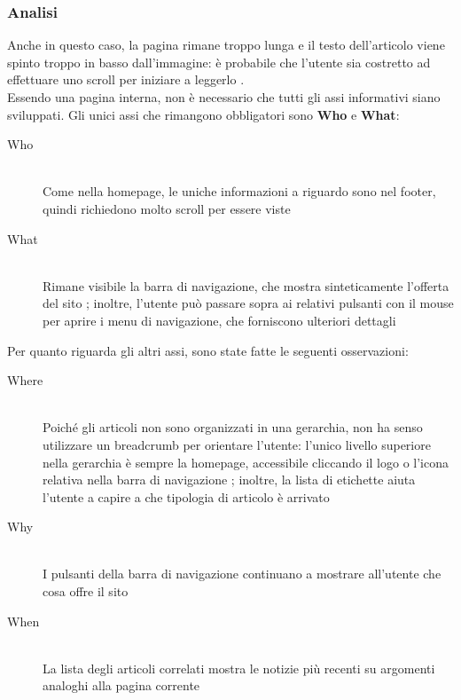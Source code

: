 \subsubsection{Analisi}
\label{sub:articolo-analisi}
Anche in questo caso, la pagina rimane troppo lunga \xmark e il testo dell'articolo viene spinto troppo in basso dall'immagine: è probabile che l'utente sia costretto ad effettuare uno scroll per iniziare a leggerlo \xmark.\\
Essendo una pagina interna, non è necessario che tutti gli assi informativi siano sviluppati. Gli unici assi che rimangono obbligatori sono \textbf{Who} e \textbf{What}:
\begin{description}
    \item[Who] \hfill \\ Come nella homepage, le uniche informazioni a riguardo sono nel footer, quindi richiedono molto scroll per essere viste \xmark
    \item[What] \hfill \\ Rimane visibile la barra di navigazione, che mostra sinteticamente l'offerta del sito \cmark; inoltre, l'utente può passare sopra ai relativi pulsanti con il mouse per aprire i menu di navigazione, che forniscono ulteriori dettagli \cmark
\end{description}
Per quanto riguarda gli altri assi, sono state fatte le seguenti osservazioni:
\begin{description}
    \item[Where] \hfill \\ Poiché gli articoli non sono organizzati in una gerarchia, non ha senso utilizzare un breadcrumb per orientare l'utente: l'unico livello superiore nella gerarchia è sempre la homepage, accessibile cliccando il logo o l'icona relativa nella barra di navigazione \cmark; inoltre, la lista di etichette aiuta l'utente a capire a che tipologia di articolo è arrivato \cmark
    \item[Why] \hfill \\ I pulsanti della barra di navigazione continuano a mostrare all'utente che cosa offre il sito \cmark
    \item[When] \hfill \\ La lista degli articoli correlati mostra le notizie più recenti su argomenti analoghi alla pagina corrente \cmark
\end{description}